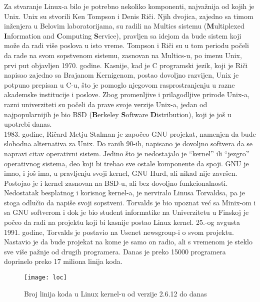 \indent Za stvaranje Linux-a bilo je potrebno nekoliko komponenti, najvažnija od kojih je Unix. Unix su stvorili Ken Tompson i Denis Riči. Njih dvojica, zajedno sa timom inženjera u Belovim laboratorijama, su radili na Multics sistemu (\textbf{M}ultiplexed \textbf{I}nformation and \textbf{C}omputing \textbf{S}ervice), pravljen sa idejom da bude sistem koji može da radi više poslova u isto vreme. Tompson i Riči su u  tom periodu počeli da rade na svom sopstvenom sistemu, zasnovan na Multics-u, po imenu Unix, prvi put objavljen 1970. godine. Kasnije, kad je C programski jezik, koji je Riči napisao zajedno sa Brajanom Kernigenom, postao dovoljno razvijen, Unix je potpuno prepisan u C-u, što je pomoglo njegovom rasprostranjenju u razne akademske institucije i poslove. Zbog promenljive i prilagodljive prirode Unix-a, razni univerziteti su počeli da prave svoje verzije Unix-a, jedan od najpopularnijih je bio BSD (\textbf{B}erkeley \textbf{S}oftware \textbf{D}istribution), koji je još u upotrebi danas.\\

1983. godine, Ričard Metju Stalman je započeo GNU projekat, namenjen da bude slobodna alternativa za Unix. Do ranih 90-ih, napisano je dovoljno softvera da se napravi citav operativni sistem. Jedino što je nedostajalo je ``kernel'' ili ``jezgro'' operativnog sistema, deo koji bi trebao sve ostale komponente da spoji. GNU je imao, i još ima, u pravljenju svoji kernel, GNU Hurd, ali nikad nije završen. Postojao je i kernel zasnovan na BSD-u, ali bez dovoljno funkcionalnosti.\\

Nedostatak besplatnog i korisnog kernel-a, je nerviralo Linusa Torvaldsa, pa je stoga odlučio da napiše svoji sopstveni. Torvalds je bio upoznat već sa Minix-om i sa GNU softverom i dok je bio student informatike na Univerzitetu u Finskoj je počeo da radi na projektu koji bi kasnije postao Linux kernel. 25.-og avgusta 1991. godine, Torvalds je postavio na Usenet newsgroup-i o svom projektu. Nastavio je da bude projekat na kome je samo on radio, ali s vremenom je steklo sve više pažnje od drugih programera. Danas je preko 15000 programera  doprinelo preko 17 miliona linija koda.
\newpage
\begin{figure}[h]
	\centering
    \hspace{1cm}
\end{figure}
\begin{figure}[h]
	\centering
    \hspace{1cm}
\end{figure}
\begin{figure}[H]
	\centering
	\texttt{[image: loc]}
	\caption{Broj linija koda u Linux kernel-u od verzije 2.6.12 do danas}
\end{figure}
\newpage